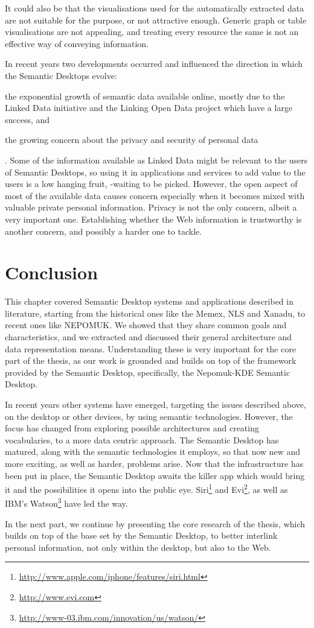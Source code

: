It could also be that the visualisations used for the automatically extracted data are not suitable for the purpose, or not attractive enough.
Generic graph or table visualisations are not appealing, and treating every resource the same is not an effective way of conveying information.

In recent years two developments occurred and influenced the direction in which the Semantic Desktops evolve: \begin{inparaenum}[(i)] \item the exponential growth of semantic data available online, mostly due to the Linked Data initiative and the Linking Open Data project which have a large success, and \item the growing concern about the privacy and security of personal data\end{inparaenum}. 
Some of the information available as Linked Data might be relevant to the users of Semantic Desktops, so using it in applications and services to add value to the users is a low hanging fruit, -waiting to be picked. However, the open aspect of most of the available data causes concern especially when it becomes mixed with valuable private personal information. Privacy is not the only concern, albeit a very important one. Establishing whether the Web information is trustworthy is another concern, and possibly a harder one to tackle.

\section{Conclusion}

This chapter covered Semantic Desktop systems and applications described in literature, starting from the historical ones like the Memex, NLS and Xanadu, to recent ones like NEPOMUK. We showed that they share common goals and characteristics, and we extracted and discussed their general architecture and data representation means. Understanding these is very important for the core part of the thesis, as our work is grounded and builds on top of the framework provided by the Semantic Desktop, specifically, the Nepomuk-KDE Semantic Desktop.

In recent years other systems have emerged, targeting the issues described above, on the desktop or other devices, by using semantic technologies. However, the focus has changed from exploring possible architectures and creating vocabularies, to a more data centric approach. The Semantic Desktop has matured, along with the semantic technologies it employs, so that now new and more exciting, as well as harder, problems arise. Now that the infrastructure has been put in place, the Semantic Desktop awaits the killer app which would bring it and the possibilities it opens into the public eye. Siri\footnote{\url{http://www.apple.com/iphone/features/siri.html}} and Evi\footnote{\url{http://www.evi.com}}, as well as IBM's Watson\footnote{\url{http://www-03.ibm.com/innovation/us/watson/}} have led the way.

In the next part, we continue by presenting the core research of the thesis, which builds on top of the base set by the Semantic Desktop, to better interlink personal information, not only within the desktop, but also to the Web.
